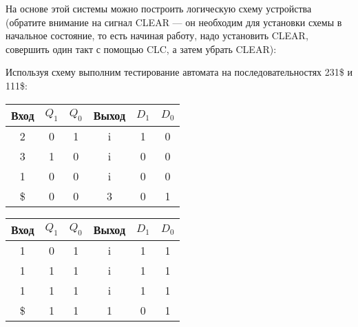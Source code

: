 На основе этой системы можно построить логическую схему устройства (обратите внимание на сигнал CLEAR --- он необходим
для установки схемы в начальное состояние, то есть начиная работу, надо установить CLEAR, совершить один такт с помощью
CLC, а затем убрать CLEAR):

Используя схему выполним тестирование автомата на последовательностях 231\$ и 111\$:

\begin{table}[H]
    \centering
    \begin{tabular}{|c|cc|c|cc|}
        \hline
        Вход & $Q_1$ & $Q_0$ & Выход & $D_1$ & $D_0$ \\
        \hline
        2  & 0 & 1 & i & 1 & 0 \\
        3  & 1 & 0 & i & 0 & 0 \\
        1  & 0 & 0 & i & 0 & 0 \\
        \$ & 0 & 0 & 3 & 0 & 1 \\
        \hline
    \end{tabular}
    \hfill
    \begin{tabular}{|c|cc|c|cc|}
        \hline
        Вход & $Q_1$ & $Q_0$ & Выход & $D_1$ & $D_0$ \\
        \hline
        1  & 0 & 1 & i & 1 & 1 \\
        1  & 1 & 1 & i & 1 & 1 \\
        1  & 1 & 1 & i & 1 & 1 \\
        \$ & 1 & 1 & 1 & 0 & 1 \\
        \hline
    \end{tabular}
    \hfill
\end{table}

